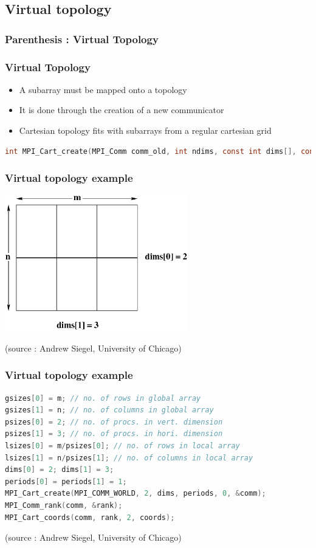\subsection{Virtual topology}

\begin{frame}[containsverbatim]
\frametitle{Parenthesis : Virtual Topology}
\frametitle{Virtual Topology}
\begin{itemize}
	\item {A subarray must be mapped onto a topology}
	\item {It is done through the creation of a new communicator}
	\item {Cartesian topology fits with subarrays from a regular cartesian grid}
\end{itemize}
\begin{lstlisting}[language=C,frame=lines]
int MPI_Cart_create(MPI_Comm comm_old, int ndims, const int dims[], const int periods[], int reorder, MPI_Comm *comm_cart)
\end{lstlisting}
\end{frame}


\begin{frame}[containsverbatim]
\frametitle{Virtual topology example}
\begin{center}
\includegraphics[width=8cm]{Day3/images/topology.eps}
\end{center}
(source : Andrew Siegel, University of Chicago)
\end{frame}


\begin{frame}[containsverbatim]
\frametitle{Virtual topology example}
\begin{lstlisting}[language=C,frame=lines]
gsizes[0] = m; // no. of rows in global array
gsizes[1] = n; // no. of columns in global array
psizes[0] = 2; // no. of procs. in vert. dimension
psizes[1] = 3; // no. of procs. in hori. dimension
lsizes[0] = m/psizes[0]; // no. of rows in local array
lsizes[1] = n/psizes[1]; // no. of columns in local array
dims[0] = 2; dims[1] = 3;
periods[0] = periods[1] = 1;
MPI_Cart_create(MPI_COMM_WORLD, 2, dims, periods, 0, &comm);
MPI_Comm_rank(comm, &rank);
MPI_Cart_coords(comm, rank, 2, coords);
\end{lstlisting}
(source : Andrew Siegel, University of Chicago)
\end{frame}

